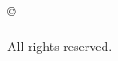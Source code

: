 \thispagestyle{plain}
\vspace*{\fill}
\begin{center}
  \copyright\ \thesisyear\\
  \thesisauthor\\
  All rights reserved.
\end{center}
\vspace*{1in}
\clearpage
